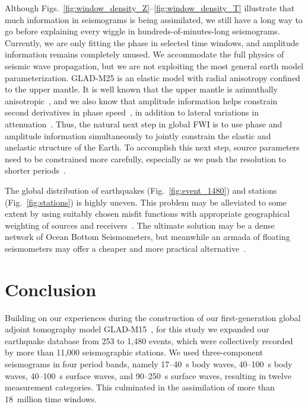 Although Figs.~\ref{fig:window_density_Z}--\ref{fig:window_density_T} illustrate that much information in seismograms is
being assimilated, we still have a long way to go before explaining every wiggle in hundreds-of-minutes-long seismograms.
Currently, we are only fitting the phase in selected time windows, and amplitude information remains completely unused.
We accommodate the full physics of seismic wave propagation,
but we are not exploiting the most general earth model parameterization.
GLAD-M25 is an elastic model with radial anisotropy confined to the upper mantle.
It is well known that the upper mantle is azimuthally anisotropic~\cite{montagner1989petrological,montagner1991},
and we also know that amplitude information helps constrain second derivatives in phase speed~\cite{WW86,TDI,TDII},
in addition to lateral variations in attenuation~\cite{romanowicz1998,reidetal2001,DaEkDz08}.
Thus, the natural next step in global FWI is to use phase and amplitude information simultaneously to jointly constrain the elastic and anelastic structure of the Earth.
To accomplish this next step, source parameters need to be constrained more carefully, especially as we push the resolution to shorter periods~\cite{valentine2010}.

The global distribution of earthquakes (Fig.~\ref{fig:event_1480}) and stations (Fig.~\ref{fig:stations}) is highly uneven.
This problem may be alleviated to some extent by using suitably chosen misfit functions with appropriate geographical weighting of sources and receivers~\cite{Li1996,Ruanetal2018}.
The ultimate solution may be a dense network of Ocean Bottom Seismometers,
but meanwhile an armada of floating seismometers may offer a cheaper and more practical alternative~\cite{Nolet19}.

\section{Conclusion}

Building on our experiences during the construction of our first-generation global adjoint tomography model GLAD-M15~\cite{bozdaug2016global},
for this study we expanded our earthquake database from 253 to 1,480 events,
which were collectively recorded by more than 11,000 seismographic stations.
We used three-component seismograms in four period bands,
namely 17--40~s body waves, 40--100~s body waves, 40--100~s surface waves, and 90--250~s surface waves,
resulting in twelve measurement categories.
This culminated in the assimilation of more than 18~million time windows.

